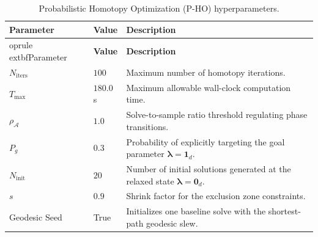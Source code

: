 \begin{longtable}{@{}p{}p{}p{}@{}}
    \caption{Probabilistic Homotopy Optimization (P-HO) hyperparameters.}
    \label{tab:params_pho}\\
        \toprule
        \textbf{Parameter} & \textbf{Value} & \textbf{Description} \\
        \midrule
\endfirsthead

        	oprule
        	extbf{Parameter} & \textbf{Value} & \textbf{Description} \\
        \midrule
\endhead

        \bottomrule
\endfoot

        $N_{\text{iters}}$ & $100$ & Maximum number of homotopy iterations. \\
        $T_{\max}$ & $180.0$\,s & Maximum allowable wall-clock computation time. \\
        $\rho_{\mathcal{A}}$ & $1.0$ & Solve-to-sample ratio threshold regulating phase transitions. \\
        $P_g$ & $0.3$ & Probability of explicitly targeting the goal parameter $\boldsymbol{\lambda} = \mathbf{1}_d$. \\
        $N_{\text{init}}$ & $20$ & Number of initial solutions generated at the relaxed state $\boldsymbol{\lambda} = \mathbf{0}_d$. \\
        $s$ & $0.9$ & Shrink factor for the exclusion zone constraints. \\
        Geodesic Seed & True & Initializes one baseline solve with the shortest-path geodesic slew. \\
        \bottomrule
\end{longtable}

